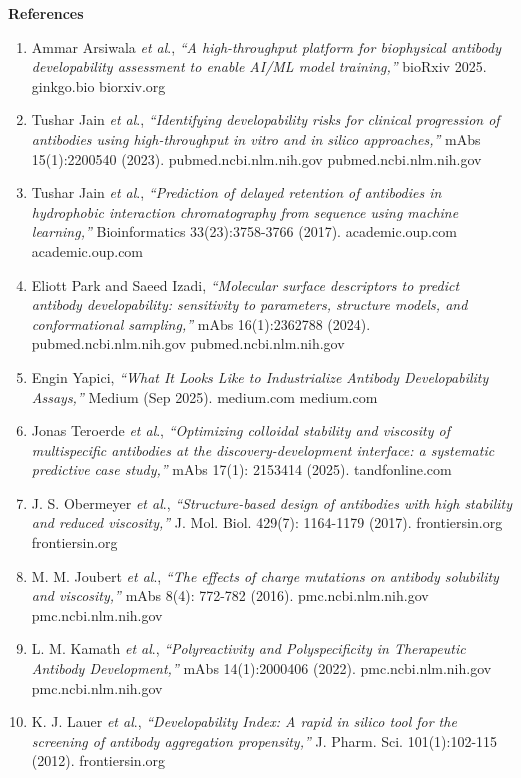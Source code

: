 \documentclass[12pt]{article}
\begin{document}
\medskip
\noindent \textbf{References}

{\small
\begin{enumerate}\itemsep -2pt
\item Ammar Arsiwala \textit{et al}., \textit{“A high-throughput platform for biophysical antibody developability assessment to enable AI/ML model training,”} bioRxiv 2025. 
ginkgo.bio
biorxiv.org

\item Tushar Jain \textit{et al}., \textit{“Identifying developability risks for clinical progression of antibodies using high-throughput in vitro and in silico approaches,”} mAbs 15(1):2200540 (2023). 
pubmed.ncbi.nlm.nih.gov
pubmed.ncbi.nlm.nih.gov

\item Tushar Jain \textit{et al}., \textit{“Prediction of delayed retention of antibodies in hydrophobic interaction chromatography from sequence using machine learning,”} Bioinformatics 33(23):3758-3766 (2017). 
academic.oup.com
academic.oup.com

\item Eliott Park and Saeed Izadi, \textit{“Molecular surface descriptors to predict antibody developability: sensitivity to parameters, structure models, and conformational sampling,”} mAbs 16(1):2362788 (2024). 
pubmed.ncbi.nlm.nih.gov
pubmed.ncbi.nlm.nih.gov

\item Engin Yapici, \textit{“What It Looks Like to Industrialize Antibody Developability Assays,”} Medium (Sep 2025). 
medium.com
medium.com

\item Jonas Teroerde \textit{et al}., \textit{“Optimizing colloidal stability and viscosity of multispecific antibodies at the discovery-development interface: a systematic predictive case study,”} mAbs 17(1): 2153414 (2025). 
tandfonline.com

\item J. S. Obermeyer \textit{et al}., \textit{“Structure-based design of antibodies with high stability and reduced viscosity,”} J. Mol. Biol. 429(7): 1164-1179 (2017). 
frontiersin.org
frontiersin.org

\item M. M. Joubert \textit{et al}., \textit{“The effects of charge mutations on antibody solubility and viscosity,”} mAbs 8(4): 772-782 (2016). 
pmc.ncbi.nlm.nih.gov
pmc.ncbi.nlm.nih.gov

\item L. M. Kamath \textit{et al}., \textit{“Polyreactivity and Polyspecificity in Therapeutic Antibody Development,”} mAbs 14(1):2000406 (2022). 
pmc.ncbi.nlm.nih.gov
pmc.ncbi.nlm.nih.gov

\item K. J. Lauer \textit{et al}., \textit{“Developability Index: A rapid in silico tool for the screening of antibody aggregation propensity,”} J. Pharm. Sci. 101(1):102-115 (2012). 
frontiersin.org

\end{enumerate}
}
\end{document}
